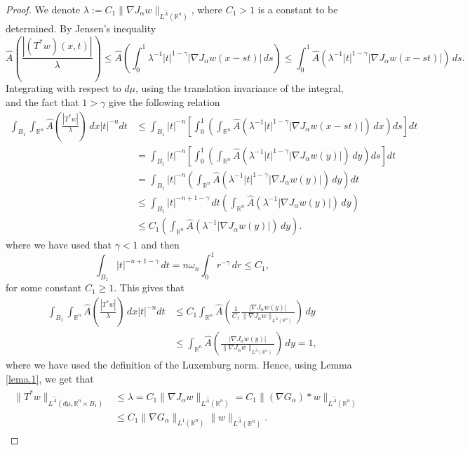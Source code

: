 \documentclass[leqno,twoside, 12pt]{amsart}
\theoremstyle{plain}
\numberwithin{equation}{section} \numberwithin{figure}{section}
\theoremstyle{definition}
\newcommand{\R}{\mathbb R}
\numberwithin{equation}{section}
\begin{document}
\begin{proof}
We denote $\lambda:=C_1\|\nabla J_\alpha w\|_{L^{\hat A}(\R^n)}$, where $C_1>1$ is a constant to be determined. By Jensen's inequality
$$
\hat{A}\left(\frac{|(T^*w)(x,t)|}{\lambda}\right) \leq \hat{A}\left(  \int_0^1 \lambda^{-1}|t|^{1-\gamma} |\nabla J_\alpha w(x - st)| \, ds \right) 
\leq 
\int_0^1 \hat{A}\left( \lambda^{-1}|t|^{1-\gamma} |\nabla J_\alpha w(x - st)| \right) \, ds.
$$
Integrating with respect to $d\mu$, using the translation invariance  of the integral, and the fact that $1>\gamma$ give the following relation
\begin{align*}
\int_{B_1} \int_{\mathbb{R}^n} \hat{A}\left( \frac{|T^*w|}{\lambda}\right) \, dx |t|^{-n} dt 
&\leq 
\int_{B_1} |t|^{-n} \left[ \int_0^1 \left( \int_{\mathbb{R}^n} \hat{A}(\lambda^{-1}|t|^{1-\gamma} |\nabla J_\alpha w(x - st)|) \, dx \right) ds \right] dt\\
&=
\int_{B_1} |t|^{-n} \left[ \int_0^1 \left( \int_{\mathbb{R}^n} \hat{A}(\lambda^{-1}|t|^{1-\gamma} |\nabla J_\alpha w(y)|) \, dy \right) ds \right] dt\\
&=
\int_{B_1} |t|^{-n}   \left( \int_{\mathbb{R}^n} \hat{A}( \lambda^{-1}|t|^{1-\gamma} |\nabla J_\alpha w(y)|) \, dy \right) dt\\
&\leq
\int_{B_1} |t|^{-n+1-\gamma} \,dt  \left( \int_{\mathbb{R}^n} \hat{A}( \lambda^{-1}|\nabla J_\alpha w(y)|) \, dy \right)\\
&\leq
C_1 \left( \int_{\mathbb{R}^n} \hat{A}( \lambda^{-1}|\nabla J_\alpha w(y)|) \, dy \right).
\end{align*}
where we have used that $\gamma<1$ and then
$$
\int_{B_1} |t|^{-n+1-\gamma} \,dt  = n\omega_n \int_0^1 r^{-\gamma}\,dr \leq C_1,
$$
for some constant $C_1\geq 1$. This gives that
\begin{align*}
\int_{B_1} \int_{\mathbb{R}^n} \hat{A}\left( \frac{|T^*w|}{\lambda}\right) \, dx |t|^{-n} dt &\leq  C_1
 \int_{\mathbb{R}^n} \hat{A}\left( \frac{1}{C_1} \frac{|\nabla J_\alpha w(y)|}{\|\nabla J_\alpha w\|_{L^{\hat A}(\R^n)}}\right) \, dy  \\
&\leq  
 \int_{\mathbb{R}^n} \hat{A}\left( \frac{|\nabla J_\alpha w(y)|}{\|\nabla J_\alpha w\|_{L^{\hat A}(\R^n)}}\right) \, dy  =1,
\end{align*}
where we have used the definition of the Luxemburg norm.  Hence,  using Lemma \ref{lema.1}, we get that
\begin{align} \label{cota.t.1}
\begin{split}
\|T^*w\|_{L^{\hat{A}}(d\mu,  \mathbb{R}^n \times B_1  )} &\leq 
\lambda = C_1 \|\nabla J_\alpha w\|_{L^{\hat A}(\R^n)} =
C_1 \|(\nabla G_\alpha)* w\|_{L^{\hat A}(\R^n)}\\ 
&\leq 
C_1 \|\nabla G_\alpha\|_{L^1(\R^n)} \|w\|_{L^{\hat A}(\R^n)}.
\end{split}
\end{align}



\end{proof}
\end{document}

